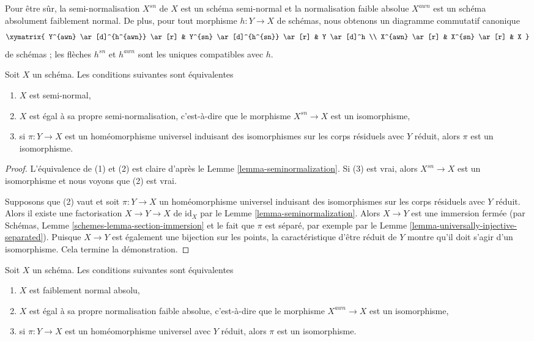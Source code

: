 \noindent
Pour être sûr, la semi-normalisation $X^{sn}$ de $X$ est un schéma
semi-normal et la normalisation faible absolue $X^{awn}$ est un
schéma absolument faiblement normal.
De plus, pour tout morphisme $h : Y \to X$ de schémas, nous obtenons un
diagramme commutatif canonique
$$
\xymatrix{
Y^{awn} \ar[d]^{h^{awn}} \ar[r] &
Y^{sn} \ar[d]^{h^{sn}} \ar[r] &
Y \ar[d]^h \\
X^{awn} \ar[r] &
X^{sn} \ar[r] &
X
}
$$
de schémas ; les flèches $h^{sn}$ et $h^{awn}$ sont les uniques compatibles
avec $h$.

\begin{lemma}
\label{lemma-characterize-seminormal}
Soit $X$ un schéma. Les conditions suivantes sont équivalentes
\begin{enumerate}
\item $X$ est semi-normal,
\item $X$ est égal à sa propre semi-normalisation, c'est-à-dire que le morphisme
$X^{sn} \to X$ est un isomorphisme,
\item si $\pi : Y \to X$ est un homéomorphisme universel induisant des isomorphismes sur les corps
résiduels avec $Y$ réduit, alors $\pi$ est un isomorphisme.
\end{enumerate}
\end{lemma}

\begin{proof}
L'équivalence de (1) et (2) est claire d'après
le Lemme \ref{lemma-seminormalization}. Si (3) est vrai, alors $X^{sn} \to X$ est un isomorphisme
et nous voyons que (2) est vrai.

\medskip\noindent
Supposons que (2) vaut et soit $\pi : Y \to X$ un homéomorphisme universel
induisant des isomorphismes sur les corps résiduels avec $Y$ réduit.
Alors il existe une factorisation $X \to Y \to X$ de $\text{id}_X$
par le Lemme \ref{lemma-seminormalization}. Alors $X \to Y$ est une immersion fermée
(par Schémas, Lemme \ref{schemes-lemma-section-immersion} et le fait que $\pi$
est séparé, par exemple par le Lemme \ref{lemma-universally-injective-separated}).
Puisque $X \to Y$ est également une bijection sur les points, la caractéristique
d'être réduit de $Y$ montre qu'il doit s'agir
d'un isomorphisme. Cela termine la démonstration.
\end{proof}

\begin{lemma}
\label{lemma-characterize-absolutely-weakly-normal}
Soit $X$ un schéma. Les conditions suivantes sont équivalentes
\begin{enumerate}
\item $X$ est faiblement normal absolu,
\item $X$ est égal à sa propre normalisation faible absolue, c’est-à-dire que le morphisme
$X^{awn} \to X$ est un isomorphisme,
\item si $\pi : Y \to X$ est un homéomorphisme universel avec $Y$ réduit, alors $\pi$
est un isomorphisme.
\end{enumerate}
\end{lemma}

